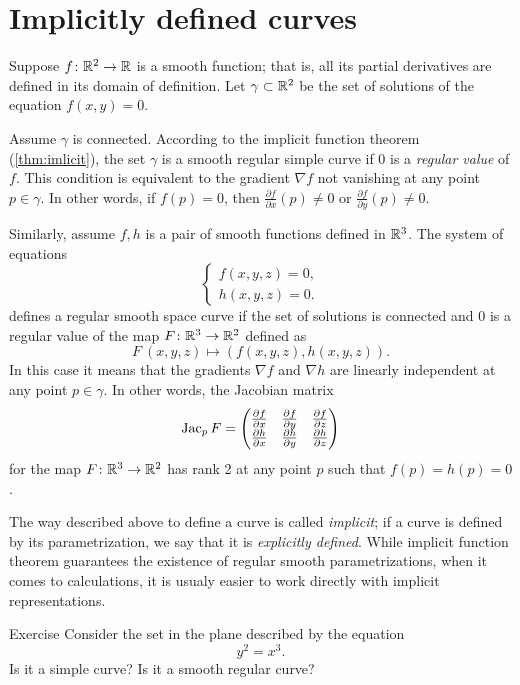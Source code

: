 \section*{Implicitly defined curves}

Suppose $f\colon\mathbb{R}^2\to \mathbb{R}$ is a smooth function; 
that is, all its partial derivatives are defined in its domain of definition.
Let $\gamma\subset \mathbb{R}^2$ be the set of solutions of the equation $f(x,y)=0$.

Assume $\gamma$ is connected.
According to the implicit function theorem (\ref{thm:imlicit}), the set $\gamma$ is a smooth regular simple curve if $0$ is a \emph{regular value} of $f$.
This condition is equivalent to the gradient $\nabla f$ not vanishing at any point $p\in \gamma$.
In other words, if $f(p)=0$, then  $\tfrac{\partial f}{\partial x}(p)\ne 0$ or $\tfrac{\partial f}{\partial y}(p)\ne 0$.

Similarly, assume $f,h$ is a pair of smooth functions defined in $\mathbb{R}^3$.
The system of equations
\[\begin{cases}
   f(x,y,z)=0,
   \\
   h(x,y,z)=0.
  \end{cases}
\]
defines a regular smooth space curve if the set of solutions is connected and $0$ is a regular value of the map $F\colon\mathbb{R}^3\to\mathbb{R}^2$ defined as
\[F\:(x,y,z)\mapsto (f(x,y,z),h(x,y,z)).\]
In this case it means that the gradients $\nabla f$ and $\nabla h$ are linearly independent at any point $p\in \gamma$.
In other words, the Jacobian matrix
\[
\mathop{\rm Jac}\nolimits_pF=\begin{pmatrix}
\tfrac{\partial f}{\partial x}&\tfrac{\partial f}{\partial y}&\tfrac{\partial f}{\partial z}\\
\tfrac{\partial h}{\partial x}&\tfrac{\partial h}{\partial y}&\tfrac{\partial h}{\partial z}
\end{pmatrix}
\]
for the map $F\colon\mathbb{R}^3\to\mathbb{R}^2$ has rank 2 at any point $p$ such that $f(p)=h(p)=0$.

The way described above to define a curve is called \emph{implicit};
if a curve is defined by its parametrization, we say that it is \emph{explicitly defined}.
While implicit function theorem guarantees the existence of regular smooth parametrizations,
when it comes to calculations, it is usualy easier to work directly with implicit representations. 

\begin{thm}{Exercise}\label{ex:y^2=x^3}
Consider the set in the plane described by the equation
\[y^2=x^3.\]
Is it a simple curve?
Is it a smooth regular curve?
\end{thm}


